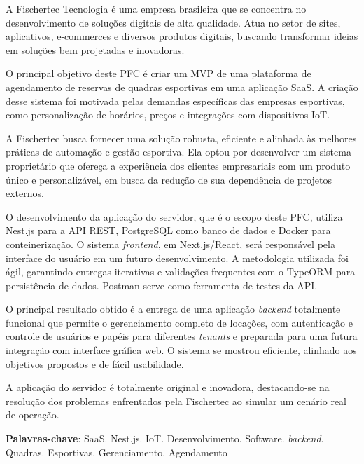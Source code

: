 \setlength{\absparsep}{18pt} %
\begin{resumo}
	\SingleSpacing
	A Fischertec Tecnologia é uma empresa brasileira que se concentra no desenvolvimento de soluções digitais de alta qualidade. Atua no setor de sites, aplicativos, e-commerces e diversos produtos digitais, buscando transformar ideias em soluções bem projetadas e inovadoras.

	O principal objetivo deste PFC é criar um \acrfull{MVP} de uma plataforma de agendamento de reservas de quadras esportivas em uma aplicação \acrfull{SaaS}. A criação desse sistema foi motivada pelas demandas específicas das empresas esportivas, como personalização de horários, preços e integrações com dispositivos \acrfull{IoT}.

	A Fischertec busca fornecer uma solução robusta, eficiente e alinhada às melhores práticas de automação e gestão esportiva. Ela optou por desenvolver um sistema proprietário que ofereça a experiência dos clientes empresariais com um produto único e personalizável, em busca da redução de sua dependência de projetos externos.

	O desenvolvimento da aplicação do servidor, que é o escopo deste PFC, utiliza Nest.js para a \acrshort{API} \acrshort{REST}, PostgreSQL como banco de dados e Docker para conteinerização. O sistema \textit{frontend}, em Next.js/React, será responsável pela interface do usuário em um futuro desenvolvimento. A metodologia utilizada foi ágil, garantindo entregas iterativas e validações frequentes com o TypeORM para persistência de dados. Postman serve como ferramenta de testes da \acrshort{API}.

	O principal resultado obtido é a entrega de uma aplicação \textit{backend} totalmente funcional que permite o gerenciamento completo de locações, com autenticação e controle de usuários e papéis para diferentes \textit{tenants} e preparada para uma futura integração com interface gráfica web. O sistema se mostrou eficiente, alinhado aos objetivos propostos e de fácil usabilidade.

	A aplicação do servidor é totalmente original e inovadora, destacando-se na resolução dos problemas enfrentados pela Fischertec ao simular um cenário real de operação.

	\textbf{Palavras-chave}: \acrshort{SaaS}. Nest.js. \acrshort{IoT}. Desenvolvimento. Software. \textit{backend}. Quadras. Esportivas. Gerenciamento. Agendamento
\end{resumo}

